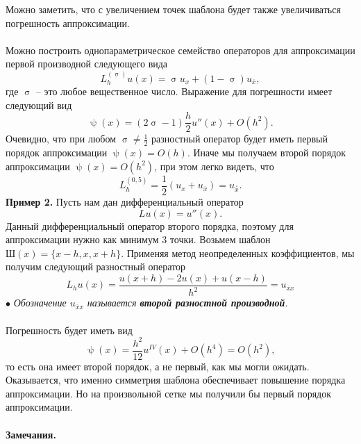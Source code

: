 \documentclass[a4paper, 12pt]{report}
\numberwithin{equation}{section}
\newcommand{\ol}{\overline}
\renewcommand{\sigma}{\upsigma}
\renewcommand{\psi}{\uppsi}
\begin{document}
Можно заметить, что с увеличением точек шаблона будет также увеличиваться погрешность аппроксимации.\\\\
Можно построить однопараметрическое семейство операторов для аппроксимации первой производной следующего вида $$L_h^{(\sigma)}u(x) = \sigma u_x + (1-\sigma)u_{\ol x},$$
где $\sigma$ -- это любое вещественное число. Выражение для погрешности имеет следующий вид
$$\psi(x) = (2\sigma - 1)\dfrac h2 u''(x) + O(h^2).$$
Очевидно, что при любом $\sigma \ne \frac 12$ разностный оператор будет иметь первый порядок аппроксимации $\psi(x) = O(h).$ Иначе мы получаем второй порядок аппроксимации $\psi(x) = O(h^2)$, при этом легко видеть, что $$L_h^{(0,5)} = \dfrac 12(u_x + u_{\ol x}) = u_{\overset\circ x}.$$
\textbf{Пример 2.} Пусть нам дан дифференциальный оператор $$Lu(x) = u''(x).$$ Данный дифференциальный оператор второго порядка, поэтому для аппроксимации нужно как минимум 3 точки. Возьмем шаблон $\text{Ш}(x) = \{x-h, x, x+h\}$. Применяя метод неопределенных коэффициентов, мы получим следующий разностный оператор \begin{equation}
L_h u(x) = \dfrac{u(x+h) - 2u(x) + u(x-h)}{h^2}=u_{\ol xx}
\end{equation}
$\bullet$ \textit{Обозначение $u_{\ol x x}$ называется \textbf{второй разностной производной}.}\\\\
Погрешность будет иметь вид $$\psi(x) = \dfrac {h^2}{12} u^{IV}(x) + O(h^4) = O(h^2),$$ то есть она имеет второй порядок, а не первый, как мы могли ожидать. Оказывается, что именно симметрия шаблона обеспечивает повышение порядка аппроксимации. Но на произвольной сетке мы получили бы первый порядок аппроксимации.\\\\
\textbf{Замечания.}
\end{document}
